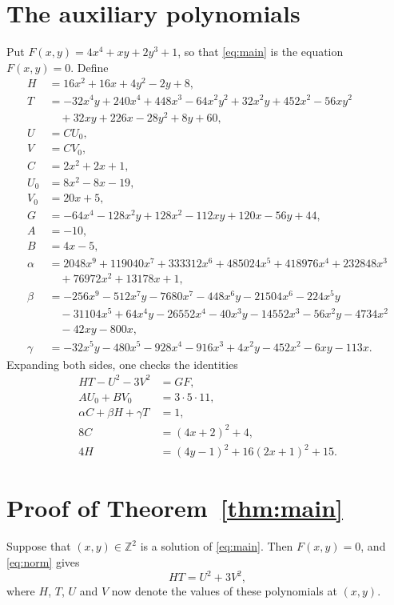 \documentclass[11pt]{article}
\newcommand{\Z}{\mathbb{Z}}
\begin{document}
\section{The auxiliary polynomials}

Put $F(x,y)=4x^{4}+xy+2y^{3}+1$, so that \eqref{eq:main} is the equation $F(x,y)=0$. Define
\begin{align*}
H&=16x^{2}+16x+4y^{2}-2y+8,\\
T&=-32x^{4}y+240x^{4}+448x^{3}-64x^{2}y^{2}+32x^{2}y+452x^{2}-56xy^{2}\\
&\quad+32xy+226x-28y^{2}+8y+60,\\
U&=CU_0,\\
V&=CV_0,\\
C&=2x^{2}+2x+1,\\
U_0&=8x^{2}-8x-19,\\
V_0&=20x+5,\\
G&=-64x^{4}-128x^{2}y+128x^{2}-112xy+120x-56y+44,\\
A&=-10,\\
B&=4x-5,\\
\alpha&=2048x^{9}+119040x^{7}+333312x^{6}+485024x^{5}+418976x^{4}+232848x^{3}\\
&\quad+76972x^{2}+13178x+1,\\
\beta&=-256x^{9}-512x^{7}y-7680x^{7}-448x^{6}y-21504x^{6}-224x^{5}y\\
&\quad-31104x^{5}+64x^{4}y-26552x^{4}-40x^{3}y-14552x^{3}-56x^{2}y-4734x^{2}\\
&\quad-42xy-800x,\\
\gamma&=-32x^{5}y-480x^{5}-928x^{4}-916x^{3}+4x^{2}y-452x^{2}-6xy-113x.
\end{align*}
Expanding both sides, one checks the identities
\begin{align}
HT-U^2-3V^2&=GF,\label{eq:norm}\\
AU_0+BV_0&=3\cdot 5\cdot 11,\label{eq:bezout}\\
\alpha C+\beta H+\gamma T&=1,\label{eq:bezoutC}\\
8C&=(4x+2)^2+4,\label{eq:Cpos}\\
4H&=(4y-1)^2+16(2x+1)^2+15.\label{eq:sign}
\end{align}

\section{Proof of Theorem~\ref{thm:main}}

Suppose that $(x,y)\in\Z^2$ is a solution of \eqref{eq:main}. Then $F(x,y)=0$, and \eqref{eq:norm} gives
\begin{equation}\label{eq:HT}
HT=U^2+3V^2,
\end{equation}
where $H$, $T$, $U$ and $V$ now denote the values of these polynomials at $(x,y)$.
\end{document}
